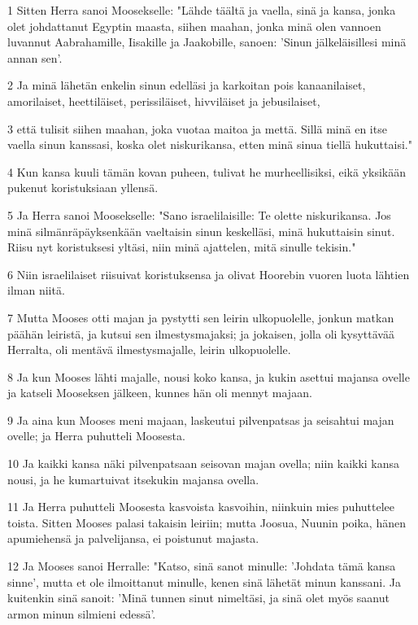 \par 1 Sitten Herra sanoi Moosekselle: "Lähde täältä ja vaella, sinä ja kansa, jonka olet johdattanut Egyptin maasta, siihen maahan, jonka minä olen vannoen luvannut Aabrahamille, Iisakille ja Jaakobille, sanoen: 'Sinun jälkeläisillesi minä annan sen'.
\par 2 Ja minä lähetän enkelin sinun edelläsi ja karkoitan pois kanaanilaiset, amorilaiset, heettiläiset, perissiläiset, hivviläiset ja jebusilaiset,
\par 3 että tulisit siihen maahan, joka vuotaa maitoa ja mettä. Sillä minä en itse vaella sinun kanssasi, koska olet niskurikansa, etten minä sinua tiellä hukuttaisi."
\par 4 Kun kansa kuuli tämän kovan puheen, tulivat he murheellisiksi, eikä yksikään pukenut koristuksiaan yllensä.
\par 5 Ja Herra sanoi Moosekselle: "Sano israelilaisille: Te olette niskurikansa. Jos minä silmänräpäyksenkään vaeltaisin sinun keskelläsi, minä hukuttaisin sinut. Riisu nyt koristuksesi yltäsi, niin minä ajattelen, mitä sinulle tekisin."
\par 6 Niin israelilaiset riisuivat koristuksensa ja olivat Hoorebin vuoren luota lähtien ilman niitä.
\par 7 Mutta Mooses otti majan ja pystytti sen leirin ulkopuolelle, jonkun matkan päähän leiristä, ja kutsui sen ilmestysmajaksi; ja jokaisen, jolla oli kysyttävää Herralta, oli mentävä ilmestysmajalle, leirin ulkopuolelle.
\par 8 Ja kun Mooses lähti majalle, nousi koko kansa, ja kukin asettui majansa ovelle ja katseli Mooseksen jälkeen, kunnes hän oli mennyt majaan.
\par 9 Ja aina kun Mooses meni majaan, laskeutui pilvenpatsas ja seisahtui majan ovelle; ja Herra puhutteli Moosesta.
\par 10 Ja kaikki kansa näki pilvenpatsaan seisovan majan ovella; niin kaikki kansa nousi, ja he kumartuivat itsekukin majansa ovella.
\par 11 Ja Herra puhutteli Moosesta kasvoista kasvoihin, niinkuin mies puhuttelee toista. Sitten Mooses palasi takaisin leiriin; mutta Joosua, Nuunin poika, hänen apumiehensä ja palvelijansa, ei poistunut majasta.
\par 12 Ja Mooses sanoi Herralle: "Katso, sinä sanot minulle: 'Johdata tämä kansa sinne', mutta et ole ilmoittanut minulle, kenen sinä lähetät minun kanssani. Ja kuitenkin sinä sanoit: 'Minä tunnen sinut nimeltäsi, ja sinä olet myös saanut armon minun silmieni edessä'.
